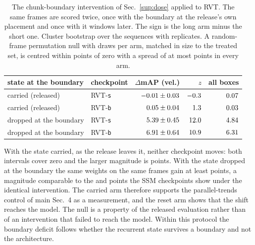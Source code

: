 \documentclass[10pt,twocolumn,letterpaper]{article}
\begin{document}
\begin{table}[h]
\centering\footnotesize
\setlength{\tabcolsep}{3.0pt}\renewcommand{\arraystretch}{0.95}
\begin{tabular}{llrrr}
\toprule
state at the boundary & checkpoint & $\Delta$mAP (vel.) & $z$ & all boxes \\
\midrule
carried (released) & RVT-\texttt{s} & $-0.01\pm0.03$ & $-0.3$ & $0.07$ \\
carried (released) & RVT-\texttt{b} & $0.05\pm0.04$ & $1.3$ & $0.03$ \\
dropped at the boundary & RVT-\texttt{s} & $5.39\pm0.45$ & $12.0$ & $4.84$ \\
dropped at the boundary & RVT-\texttt{b} & $6.91\pm0.64$ & $10.9$ & $6.31$ \\
\bottomrule
\end{tabular}
\caption{The chunk-boundary intervention of Sec.~\ref{sup:dose} applied to RVT. The same
\rvtBoundN{} frames are scored twice, once with the boundary at the release's own placement
and once with it \rvtBoundShift{} windows later. The sign is the long arm minus the short one.
Cluster bootstrap over the \outSeqsScanned{} sequences with \rvtBoundB{} replicates. A
random-frame permutation null with \rvtBoundPermR{} draws per arm, matched in size to the
treated set, is centred within \rvtBoundPermMax{} points of zero with a spread of at most
\rvtBoundPermSd{} points in every arm.}
\label{tab:rvtbound}
\end{table}

With the state carried, as the release leaves it, neither checkpoint moves: both intervals cover zero and the
larger magnitude is \rvtBoundCarryMax{} points. With the state dropped at the boundary the
same weights on the same frames gain at least \rvtBoundResetMin{} points, a magnitude
comparable to the \ssmPairedMapVelBase{} and \ssmPairedMapVelSmall{} points the SSM
checkpoints show under the identical intervention. The carried arm therefore supports the
parallel-trends control of main Sec.~4 as a measurement, and the reset arm shows
that the shift reaches the model. The null is a property of the released evaluation rather
than of an intervention that failed to reach the model. Within this protocol the boundary deficit
follows whether the recurrent state survives a boundary and not the architecture.
\end{document}
